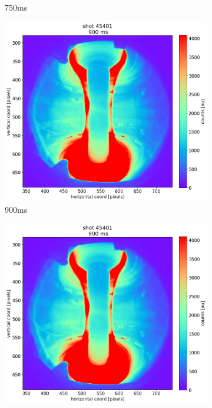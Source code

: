 \begin{figure}
\begin{subfigure}{0.3\linewidth}
         \caption{750ms}
         \label{fig:mu01_tomo3b}
    \end{subfigure}
    \begin{subfigure}{0.3\linewidth}
         \centering
         \includegraphics[trim={60 0 120 60},clip,width=\textwidth]{Chapters/chapter2/figs/45401_for_paper_900ms.png}
         \caption{900ms}
         \label{fig:mu01_tomo3c}
    \end{subfigure}
    \begin{subfigure}{0.054\linewidth}
         \centering
         \vspace{-6mm}
         \includegraphics[trim={595 0 0 50},clip,width=\textwidth]{Chapters/chapter2/figs/45401_for_paper_900ms.png}

\end{subfigure}
\end{figure}
